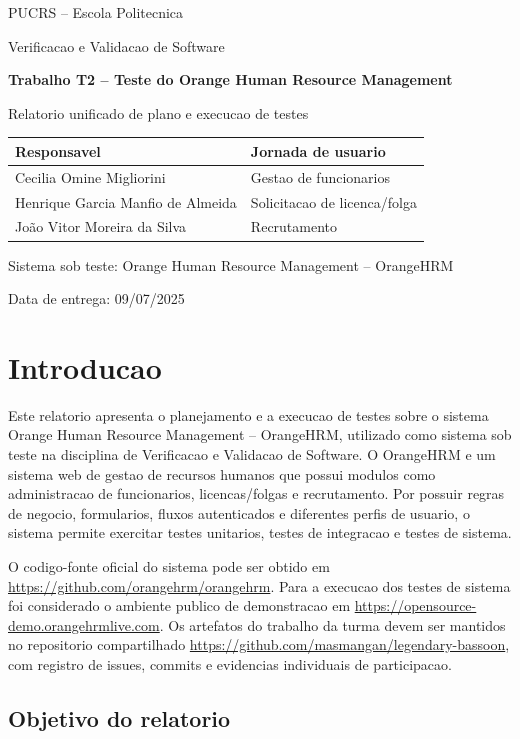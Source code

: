 \documentclass[12pt,a4paper]{article}
\providecommand{\PessoaUm}{Cecilia Omine Migliorini}
\providecommand{\PessoaDois}{Henrique Garcia Manfio de Almeida}
\providecommand{\PessoaTres}{João Vitor Moreira da Silva}
\providecommand{\Instituicao}{PUCRS -- Escola Politecnica}
\providecommand{\Disciplina}{Verificacao e Validacao de Software}
\providecommand{\Trabalho}{Trabalho T2 -- Teste do Orange Human Resource Management}
\providecommand{\Sistema}{Orange Human Resource Management -- OrangeHRM}
\providecommand{\RepositorioTurma}{https://github.com/masmangan/legendary-bassoon}
\providecommand{\CodigoFonte}{https://github.com/orangehrm/orangehrm}
\providecommand{\ServidorTeste}{https://opensource-demo.orangehrmlive.com}
\providecommand{\DataEntrega}{09/07/2025}
\begin{document}
\begin{titlepage}
    \centering
    {\Large \Instituicao \par}
    \vspace{0.7cm}
    {\large \Disciplina \par}
    \vspace{2cm}
    {\Huge\bfseries \Trabalho \par}
    \vspace{0.6cm}
    {\Large Relatorio unificado de plano e execucao de testes \par}
    \vfill
    \begin{tabular}{ll}
        \toprule
        Responsavel & Jornada de usuario \\
        \midrule
        \PessoaUm & Gestao de funcionarios \\
        \PessoaDois & Solicitacao de licenca/folga \\
        \PessoaTres & Recrutamento \\
        \bottomrule
    \end{tabular}
    \vfill
    {Sistema sob teste: \Sistema \par}
    {Data de entrega: \DataEntrega \par}
\end{titlepage}

\tableofcontents
\newpage

\section{Introducao}

Este relatorio apresenta o planejamento e a execucao de testes sobre o sistema \Sistema, utilizado como sistema sob teste na disciplina de \Disciplina. O OrangeHRM e um sistema web de gestao de recursos humanos que possui modulos como administracao de funcionarios, licencas/folgas e recrutamento. Por possuir regras de negocio, formularios, fluxos autenticados e diferentes perfis de usuario, o sistema permite exercitar testes unitarios, testes de integracao e testes de sistema.

O codigo-fonte oficial do sistema pode ser obtido em \url{\CodigoFonte}. Para a execucao dos testes de sistema foi considerado o ambiente publico de demonstracao em \url{\ServidorTeste}. Os artefatos do trabalho da turma devem ser mantidos no repositorio compartilhado \url{\RepositorioTurma}, com registro de issues, commits e evidencias individuais de participacao.

\subsection{Objetivo do relatorio}
\end{document}
